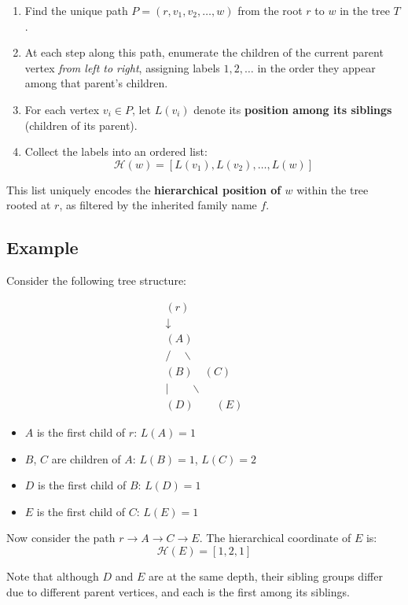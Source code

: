 \documentclass{article}
\begin{document}
\begin{enumerate}
    \item Find the unique path \( P = (r, v_1, v_2, \dots, w) \) from the root \( r \) to \( w \) in the tree \( T \).
    \item At each step along this path, enumerate the children of the current parent vertex \emph{from left to right}, assigning labels \( 1, 2, \dots \) in the order they appear among that parent's children.
    \item For each vertex \( v_i \in P \), let \( L(v_i) \) denote its \textbf{position among its siblings} (children of its parent).
    \item Collect the labels into an ordered list:
    \[
    \mathcal{H}(w) = [ L(v_1), L(v_2), \dots, L(w) ]
    \]
\end{enumerate}

This list uniquely encodes the \textbf{hierarchical position of \( w \)} within the tree rooted at \( r \), as filtered by the inherited family name \( f \).

\subsection*{Example}

Consider the following tree structure:

\[
\begin{array}{c}
(r) \\
\downarrow \\
(A) \\
/ \quad \backslash \\
(B) \quad (C) \\
| \quad \quad \backslash \\
(D) \quad \quad (E)
\end{array}
\]

\begin{itemize}
    \item \( A \) is the first child of \( r \): \( L(A) = 1 \)
    \item \( B \), \( C \) are children of \( A \): \( L(B) = 1 \), \( L(C) = 2 \)
    \item \( D \) is the first child of \( B \): \( L(D) = 1 \)
    \item \( E \) is the first child of \( C \): \( L(E) = 1 \)
\end{itemize}

Now consider the path \( r \to A \to C \to E \). The hierarchical coordinate of \( E \) is:
\[
\mathcal{H}(E) = [1, 2, 1]
\]

Note that although \( D \) and \( E \) are at the same depth, their sibling groups differ due to different parent vertices, and each is the first among its siblings.
\end{document}
